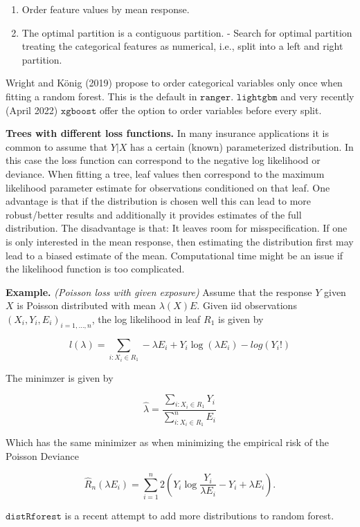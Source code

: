 \documentclass[a4paper,10pt,openany]{book}
\providecommand{\tightlist}{%
 \setlength{\itemsep}{0pt}\setlength{\parskip}{0pt}}
\begin{document}
\begin{enumerate}
\def\labelenumi{\arabic{enumi}.}
\tightlist
\item
  Order feature values by mean response.
\item
  The optimal partition is a contiguous partition.
  - Search for optimal partition treating the categorical features as numerical, i.e., split into a left and right partition.
\end{enumerate}

Wright and König (2019) propose to order categorical variables only once when fitting a random forest. This is the default in \(\texttt{ranger}\). \(\texttt{lightgbm}\) and very recently (April 2022) \(\texttt{xgboost}\) offer the option to order variables before every split.

\textbf{Trees with different loss functions.} In many insurance applications it is common to assume that \(Y|X\) has a certain (known) parameterized distribution. In this case the loss function can correspond to the negative log likelihood or deviance. When fitting a tree, leaf values then correspond to the maximum likelihood parameter estimate for observations conditioned on that leaf. One advantage is that if the distribution is chosen well this can lead to more robust/better results and additionally it provides estimates of the full distribution. The disadvantage is that: It leaves room for misspecification. If one is only interested in the mean response, then estimating the distribution first may lead to a biased estimate of the mean. Computational time might be an issue if the likelihood function is too complicated.

\textbf{Example.} \emph{(Poisson loss with given exposure)} Assume that the response \(Y\) given \(X\) is Poisson distributed with mean \(\lambda(X)E\). Given iid observations \((X_i,Y_i,E_i)_{i=1,\dots,n}\), the log likelihood in leaf \(R_1\) is given by

\[
l(\lambda)= \sum_{i: X_i\in R_1} -\lambda E_i+ Y_i\log(\lambda E_i)-log(Y_i!)
\]

The minimzer is given by

\[
\hat \lambda = \frac{\sum_{i: X_i\in R_1}  Y_i}{\sum_{i: X_i\in R_1} ^n E_i}
\]

Which has the same minimizer as when minimizing the empirical risk of the Poisson Deviance

\[
\hat R_n(\lambda E_i)=\sum_{i=1}^n 2\left(Y_i\log {\frac {Y_i}{\lambda E_i }}-Y_i+\lambda E_i \right).
\]

\href{https://github.com/henckr/distRforest}{\(\texttt{distRforest}\)} is a recent attempt to add more distributions to random forest.
\end{document}
